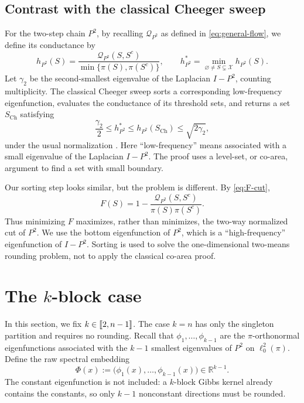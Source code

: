 \documentclass[11pt]{article}
\newcommand{\1}{\mathbf{1}}
\newcommand{\X}{\mathcal{X}}
\providecommand{\llbracket}{\mathopen{[\mkern-2.7mu[}}
\providecommand{\rrbracket}{\mathclose{]\mkern-2.7mu]}}
\begin{document}
\subsection{Contrast with the classical Cheeger sweep}

For the two-step chain $P^2$, by recalling $\mathcal Q_{P^2}$ as defined in \eqref{eq:general-flow}, we define its conductance by
\[
    h_{P^2}(S)=
    \frac{\mathcal Q_{P^2}(S,S^c)}
         {\min\{\pi(S),\pi(S^c)\}},
    \qquad
    h_{P^2}^*=\min_{\varnothing\neq S\subsetneq\X}h_{P^2}(S).
\]
Let $\gamma_2$ be the second-smallest eigenvalue of the Laplacian
$I-P^2$, counting multiplicity.  The classical Cheeger sweep sorts a corresponding
low-frequency eigenfunction, evaluates the conductance of its
threshold sets, and returns a set $S_{\mathrm{Ch}}$ satisfying
\begin{equation*}
    \frac{\gamma_2}{2}
    \leq h_{P^2}^*
    \leq h_{P^2}(S_{\mathrm{Ch}})
    \leq\sqrt{2\gamma_2},
\end{equation*}
under the usual normalization \citep{LawlerSokal1988,SinclairJerrum1989}. Here ``low-frequency'' means associated with a small eigenvalue of
the Laplacian $I-P^2$. The proof uses a level-set, or co-area, argument to find a set with
small boundary.

Our sorting step looks similar, but the problem is different.  By
\eqref{eq:F-cut},
\begin{equation*}
    F(S)
    =1-
      \frac{\mathcal Q_{P^2}(S,S^c)}{\pi(S)\pi(S^c)}.
\end{equation*}
Thus minimizing $F$ maximizes, rather than minimizes, the two-way
normalized cut of $P^2$.  We use the bottom eigenfunction of $P^2$,
which is a ``high-frequency'' eigenfunction of $I-P^2$.  Sorting is used to
solve the one-dimensional two-means rounding problem, not to apply the
classical co-area proof.  

\section{The \texorpdfstring{$k$}{k}-block case}
\label{sec:k-block}

In this section, we fix $k\in\llbracket 2,n-1\rrbracket$.  The case $k=n$ has only the
singleton partition and requires no rounding.  Recall that $\phi_1,\ldots,\phi_{k-1}$ are the
$\pi$-orthonormal eigenfunctions associated with the $k-1$
smallest eigenvalues of $P^2$ on $\ell^2_0(\pi)$.  Define the raw
spectral embedding
\begin{equation}
    \Phi(x):=\bigl(\phi_1(x),\ldots,\phi_{k-1}(x)\bigr)
    \in\mathbb{R}^{k-1}.
    \label{eq:spectral-embedding}
\end{equation}
The constant eigenfunction is not included: a $k$-block Gibbs kernel
already contains the constants, so only $k-1$ nonconstant directions
must be rounded.
\end{document}
